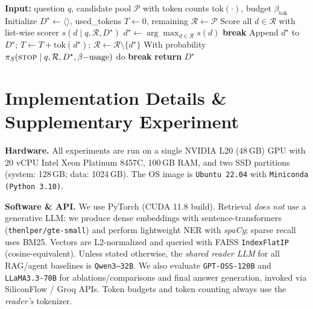 \documentclass{article} %
\begin{document}
\begin{algorithm}[H]
\caption{Context Curator (list-wise, dynamic $K$) — one pass}
\label{alg:selector}
\begin{algorithmic}[1]
\State \textbf{Input:} question $q$, candidate pool $\mathcal{P}$ with token counts $\text{tok}(\cdot)$, budget $\beta_{\text{tok}}$
\State Initialize $D^\star\!\leftarrow\!\langle\rangle$, used\_tokens $T\!\leftarrow\!0$, remaining $\mathcal{R}\!\leftarrow\!\mathcal{P}$
  \State Score all $d\!\in\!\mathcal{R}$ with list-wise scorer $s(d\mid q,\mathcal{R},D^\star)$
  \State $d^\star \leftarrow \arg\max_{d\in\mathcal{R}} s(d)$
   \textbf{break} \EndIf
  \State Append $d^\star$ to $D^\star$; $T\!\leftarrow\!T+\text{tok}(d^\star)$; $\mathcal{R}\!\leftarrow\!\mathcal{R}\setminus\{d^\star\}$
  \State With probability $\pi_S(\textsc{stop}\mid q,\mathcal{R},D^\star,\beta{-}\text{usage})$ do \textbf{break}
\EndWhile
\State \textbf{return} $D^\star$
\end{algorithmic}
\end{algorithm}


\newpage

\section{Implementation Details \& Supplementary Experiment}
\label{app:impl}

\textbf{Hardware.}
All experiments are run on a single NVIDIA L20 (48\,GB) GPU with 20 vCPU
Intel Xeon Platinum 8457C, 100\,GB RAM, and two SSD partitions
(system: 128\,GB; data: 1024\,GB). The OS image is \texttt{Ubuntu 22.04} with \texttt{Miniconda (Python 3.10)}.

\textbf{Software \& API.}
We use PyTorch (CUDA 11.8 build). Retrieval \emph{does not} use a generative LLM: we produce dense embeddings with sentence-transformers (\texttt{thenlper/gte-small}) and perform lightweight NER with \emph{spaCy}; sparse recall uses BM25. Vectors are L2-normalized and queried with FAISS \texttt{IndexFlatIP} (cosine-equivalent). 
Unless stated otherwise, the \emph{shared reader LLM} for all RAG/agent baselines is \texttt{Qwen3--32B}. We also evaluate \texttt{GPT-OSS-120B} and \texttt{LLaMA3.3-70B} for ablations/comparisons and final answer generation, invoked via SiliconFlow / Groq APIs. Token budgets and token counting always use the \emph{reader’s} tokenizer.
\end{document}
